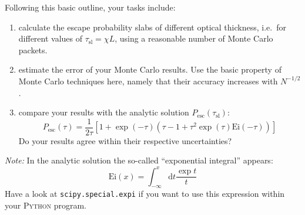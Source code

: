 \documentclass[12pt,a4paper,twoside]{article}
\begin{document}
\begin{enumerate}
  Following this basic outline, your tasks include:
  \begin{enumerate}
    \item calculate the escape probability slabs of different optical thickness,
      i.e.\ for different values of $\tau_{\mathrm{sl}} = \chi L$, using a reasonable number of
      Monte Carlo packets.
    \item estimate the error of your Monte Carlo results. Use the basic property
      of Monte Carlo techniques here, namely that their accuracy increases with
      $N^{-1/2}$.
    \item compare your results with the analytic solution
      $P_{\mathrm{esc}}(\tau_{\mathrm{sl}})$:
      \begin{equation}
      P_{\mathrm{esc}}(\tau) = \frac{1}{2 \tau} \left[ 1 +
        \exp(-\tau) \left(\tau - 1 + \tau^2 \exp(\tau) \mathrm{Ei}(-\tau) \right)
      \right] 
      \end{equation}
      Do your results agree within their respective uncertainties?
  \end{enumerate}

  \textit{Note:} In the analytic solution the so-called ``exponential integral''
  appears:
  \begin{equation*}
    \mathrm{Ei}(x) = \int_{-\infty}^x \mathrm{d}t \frac{\exp{t}}{t}
  \end{equation*}
  Have a look at \texttt{scipy.special.expi} if you want to use this expression
  within your \textsc{Python} program. 
\end{enumerate}
\end{document}
